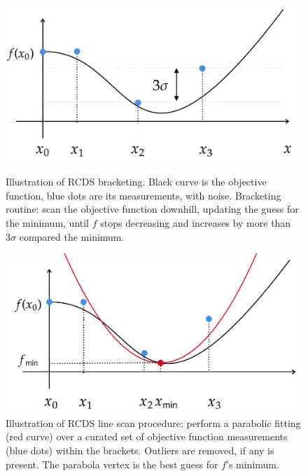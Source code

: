 \begin{figure}
    \begin{minipage}{0.48\textwidth}
        \centering
        \includegraphics[width=\textwidth]{Images/bracketing.pdf}
        \caption[Illustration of RCDS bracketing.]{Illustration of \gls*{RCDS} bracketing. Black curve is the objective function, blue dots are its measurements, with noise. Bracketing routine: scan the objective function downhill, updating the guess for the minimum, until $f$ stops decreasing and increases by more than $3\sigma$ compared the minimum.}
        \label{fig:bracketing}
    \end{minipage}
    \hfill
    \begin{minipage}{0.48\textwidth}
        \centering
        \includegraphics[width=\textwidth]{Images/linescan.pdf}
        \caption[Illustration of RCDS line scan procedure.]{Illustration of \gls*{RCDS} line scan procedure: perform a parabolic fitting (red curve) over a curated set of objective function measurements (blue dots) within the brackets. Outliers are removed, if any is present. The parabola vertex is the best guess for $f$'s minimum.}
    \end{minipage}
\end{figure}
